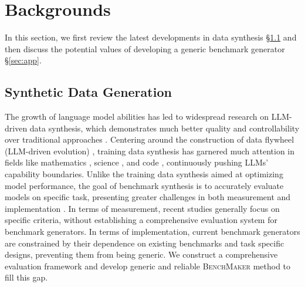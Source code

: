 \section{Backgrounds}
\label{sec:rel}
In this section, we first review the latest developments in data synthesis \S\ref{sec:syndata} and then discuss the potential values of developing a generic benchmark generator \S\ref{sec:app}.
\subsection{Synthetic Data Generation}
\label{sec:syndata}

The growth of language model abilities has led to widespread research on LLM-driven data synthesis, which demonstrates much better quality and controllability over traditional approaches \citep{datasurvey1,datasurvey2}. 
Centering around the construction of data flywheel (LLM-driven evolution) \citep{flywheel1,flywheel2}, training data synthesis has garnered much attention in fields like mathematics \citep{datamath}, science \citep{datasci}, and code \citep{datacode}, continuously pushing LLMs' capability boundaries.
Unlike the training data synthesis aimed at optimizing model performance, the goal of benchmark synthesis is to accurately evaluate models on specific task, presenting greater challenges in both measurement and implementation \citep{evalsurvey}. 
In terms of measurement, recent studies \citep{dyval,databench,perteval} generally focus on specific criteria, without establishing a comprehensive evaluation system for benchmark generators.
In terms of implementation, current benchmark generators \citep{modelwritten,unigen,dyval2,s3eval} are constrained by their dependence on existing benchmarks and task specific designs, preventing them from being generic. We construct a comprehensive  evaluation framework and develop generic and reliable \textsc{BenchMaker} method to fill this gap. 


